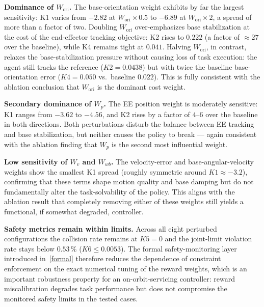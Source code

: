 \documentclass{ieeeaccess}
\newenvironment{roverlaphl}
  {\def\FrameCommand{\colorbox{roverlap}}\MakeFramed{\advance\hsize-\width\FrameRestore}}
  {\endMakeFramed}
\begin{document}
\begin{roverlaphl}
\noindent\textbf{Dominance of $W_{\mathrm{ori}}$.} The base-orientation weight exhibits by far the largest sensitivity:
K1 varies from $-2.82$ at $W_{\mathrm{ori}}\times 0.5$ to $-6.89$ at $W_{\mathrm{ori}}\times 2$, a spread of more than
a factor of two. Doubling $W_{\mathrm{ori}}$ over-emphasizes base stabilization at the cost of the end-effector tracking
objective: K2 rises to $0.222$ (a factor of $\approx 27$ over the baseline), while K4 remains tight at $0.041$.
Halving $W_{\mathrm{ori}}$, in contrast, relaxes the base-stabilization pressure without causing loss of task execution:
the agent still tracks the reference ($K2=0.0438$) but with twice the baseline base-orientation error
($K4=0.050$ vs.\ baseline $0.022$). This is fully consistent with the ablation conclusion that $W_{\mathrm{ori}}$
is the dominant cost weight.

\noindent\textbf{Secondary dominance of $W_p$.} The EE position weight is moderately sensitive: K1 ranges from
$-3.62$ to $-4.56$, and K2 rises by a factor of $4$--$6$ over the baseline in both directions. Both perturbations
disturb the balance between EE tracking and base stabilization, but neither causes the policy to break — again
consistent with the ablation finding that $W_p$ is the second most influential weight.

\noindent\textbf{Low sensitivity of $W_v$ and $W_{wb}$.} The velocity-error and base-angular-velocity weights show
the smallest K1 spread (roughly symmetric around $K1\approx -3.2$), confirming that these terms shape motion
quality and base damping but do not fundamentally alter the task-solvability of the policy. This aligns with the
ablation result that completely removing either of these weights still yields a functional, if somewhat degraded,
controller.

\noindent\textbf{Safety metrics remain within limits.} Across all eight perturbed configurations the collision rate
remains at $K5=0$ and the joint-limit violation rate stays below $0.53\,\%$ ($K6 \le 0.0053$). The formal
safety-monitoring layer introduced in~\autoref{formal} therefore reduces the dependence of constraint enforcement
on the exact numerical tuning of the reward weights, which is an important robustness property for an
on-orbit-servicing controller: reward miscalibration degrades task performance but does not compromise the
monitored safety limits in the tested cases.


\end{roverlaphl}
\end{document}
